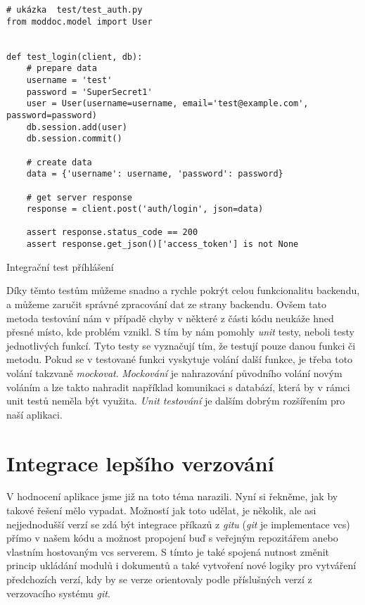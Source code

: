\begin{listing}[h]
    \begin{verbatim}
# ukázka  test/test_auth.py
from moddoc.model import User


def test_login(client, db):
    # prepare data
    username = 'test'
    password = 'SuperSecret1'
    user = User(username=username, email='test@example.com', password=password)
    db.session.add(user)
    db.session.commit()

    # create data
    data = {'username': username, 'password': password}

    # get server response
    response = client.post('auth/login', json=data)

    assert response.status_code == 200
    assert response.get_json()['access_token'] is not None
    \end{verbatim}
    \caption{Integrační test příhlášení}
    \label{lst:authTest}
\end{listing}

Díky těmto testům můžeme snadno a rychle pokrýt celou funkcionalitu backendu, a můžeme zaručit správné zpracování dat ze strany backendu.
Ovšem tato metoda testování nám v případě chyby v některé z části kódu neukáže hned přesné místo, kde problém vznikl. S tím by nám pomohly
\textit{unit} testy, neboli testy jednotlivých funkcí. Tyto testy se vyznačují tím, že testují pouze danou funkci či metodu. Pokud se v testované funkci
vyskytuje volání další funkce, je třeba toto volání takzvaně \textit{mockovat}. \textit{Mockování} je nahrazování původního volání novým voláním a
lze takto nahradit například komunikaci s databází, která by v rámci unit testů neměla být využita. \textit{Unit testování} je dalším dobrým
rozšířením pro naší aplikaci.

\clearpage

\section{Integrace lepšího verzování}

V hodnocení aplikace jsme již na toto téma narazili. Nyní si řekněme, jak by takové řešení mělo vypadat. Možností jak toto udělat, je několik,
ale asi nejjednodušší verzí se zdá být integrace příkazů z \textit{gitu} (\textit{git} je implementace \gls{vcs}) přímo v našem kódu a možnost propojení buď s veřejným repozitářem
anebo vlastním hostovaným \gls{vcs} serverem. S tímto je také spojená nutnost změnit princip ukládání modulů i dokumentů a také vytvoření nové
logiky pro vytváření předchozích verzí, kdy by se verze orientovaly podle příslušných verzí z verzovacího systému \textit{git}.

